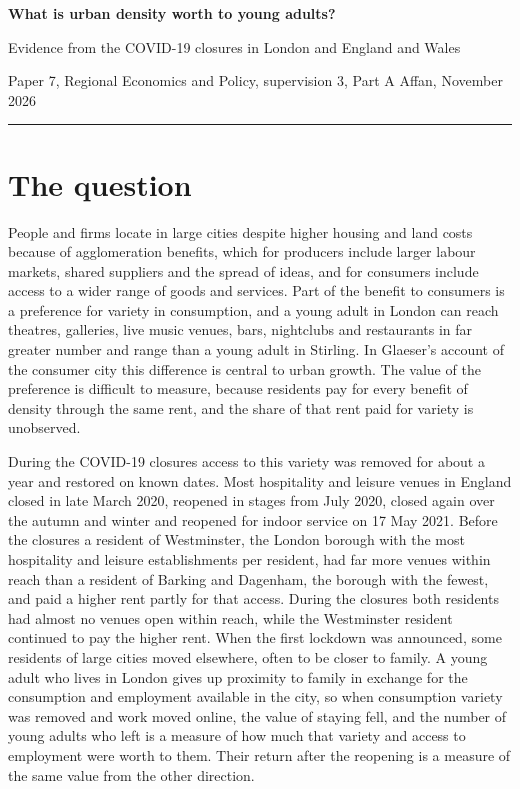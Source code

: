 \documentclass[11pt,a4paper]{article}
\begin{document}
{\Large\bfseries What is urban density worth to young adults?\par}
\vspace{0.2em}
{\large Evidence from the COVID-19 closures in London and England and Wales\par}
\vspace{0.6em}
{\small Paper 7, Regional Economics and Policy, supervision 3, Part A \hfill Affan, November 2026\par}
\vspace{0.3em}
\hrule
\vspace{0.4em}

\section{The question}

People and firms locate in large cities despite higher housing and land costs because of agglomeration benefits, which for producers include larger labour markets, shared suppliers and the spread of ideas, and for consumers include access to a wider range of goods and services. Part of the benefit to consumers is a preference for variety in consumption, and a young adult in London can reach theatres, galleries, live music venues, bars, nightclubs and restaurants in far greater number and range than a young adult in Stirling. In Glaeser's account of the consumer city this difference is central to urban growth. The value of the preference is difficult to measure, because residents pay for every benefit of density through the same rent, and the share of that rent paid for variety is unobserved.

During the COVID-19 closures access to this variety was removed for about a year and restored on known dates. Most hospitality and leisure venues in England closed in late March 2020, reopened in stages from July 2020, closed again over the autumn and winter and reopened for indoor service on 17 May 2021. Before the closures a resident of Westminster, the London borough with the most hospitality and leisure establishments per resident, had far more venues within reach than a resident of Barking and Dagenham, the borough with the fewest, and paid a higher rent partly for that access. During the closures both residents had almost no venues open within reach, while the Westminster resident continued to pay the higher rent. When the first lockdown was announced, some residents of large cities moved elsewhere, often to be closer to family. A young adult who lives in London gives up proximity to family in exchange for the consumption and employment available in the city, so when consumption variety was removed and work moved online, the value of staying fell, and the number of young adults who left is a measure of how much that variety and access to employment were worth to them. Their return after the reopening is a measure of the same value from the other direction.
\end{document}
